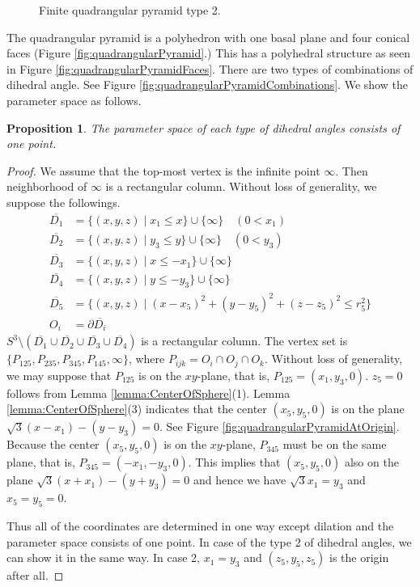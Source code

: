 \documentclass[suppldata, dvipdfmx]{interact}
\theoremstyle{plain}%
\newtheorem{proposition}[theorem]{Proposition}
\theoremstyle{definition}
\theoremstyle{remark}
\theoremstyle{problemstyle}
\begin{document}
\begin{figure}[H]
\begin{minipage}{0.5\textwidth}
\begin{minipage}[t]{0.24\textwidth}
   \label{fig:pentahedralPyramidLimitsetFinite2}
  \end{minipage}
  \hspace*{\fill}
  \caption{Finite quadrangular pyramid type 2.}
  \label{fig:pentahedralPyramidFinite2}
 \end{minipage}
\end{figure}

The quadrangular pyramid is a polyhedron with one basal plane and four conical faces (Figure \ref{fig:quadrangularPyramid}.)  
This has a polyhedral structure as seen in Figure \ref{fig:quadrangularPyramidFaces}. 
There are two types of combinations of dihedral angle. See Figure \ref{fig:quadrangularPyramidCombinations}.  
We show the parameter space as follows.

\begin{proposition}
The parameter space of each type of dihedral angles consists of one point.
\end{proposition}

\begin{proof}
We assume that the top-most vertex is the infinite point $\infty$.  Then neighborhood of $\infty$ is a rectangular column.  Without loss of generality, 
we suppose the followings.
\begin{align*}
\overline{D_1}&=\{(x,y,z) \mid x_1 \le x \} \cup\{\infty\} \quad (0<x_1)\\
\overline{D_2}&=\{(x,y,z) \mid y_3 \le y \} \cup\{\infty\}\quad (0<y_3)\\
\overline{D_3}&=\{(x,y,z) \mid x \le -x_1 \} \cup\{\infty\}\\
\overline{D_4}&=\{(x,y,z) \mid y \le -y_3 \} \cup\{\infty\}\\
\overline{D_5}&=\{(x,y,z) \mid (x-x_5)^2+(y-y_5)^2+(z-z_5)^2 \le r_5^2\} \\
O_i &= \partial\overline{D_i}
\end{align*}
$S^3\setminus(\overline{D_1}\cup\overline{D_2}\cup\overline{D_3}\cup\overline{D_4})$ is a rectangular column. The vertex set is $\{ P_{125}, P_{235}, P_{345}, P_{145}, \infty\}$, where $P_{ijk}= O_i\cap O_j\cap O_k$.  Without loss of generality, we may suppose that $P_{125}$ is on the $xy$-plane, that is, $P_{125}=(x_1, y_3, 0)$.  $z_5=0$ follows from Lemma \ref{lemma:CenterOfSphere}(1).  Lemma \ref{lemma:CenterOfSphere}(3) indicates that the center $(x_5, y_5, 0)$ is on the plane $\sqrt{3}(x-x_1)-(y-y_3)=0$.  See Figure \ref{fig:quadrangularPyramidAtOrigin}.  Because the center $(x_5, y_5,0)$ is on the $xy$-plane, $P_{345}$ must be on the same plane, that is, $P_{345}=(-x_1, -y_3, 0)$.  This implies that $(x_5, y_5, 0)$ also on the plane $\sqrt{3}(x+x_1)-(y+y_3)=0$ and hence we have $\sqrt{3}x_1 = y_3$ and $x_5=y_5=0$.

Thus all of the coordinates are determined in one way except dilation and the parameter space consists of one point.  In case of the type 2 of dihedral angles, we can show it in the same way.  In case 2, $x_1 = y_3$ and $(z_5, y_5, z_5)$ is the origin after all.
\end{proof}
\end{document}
